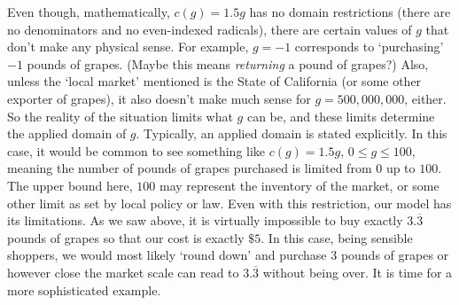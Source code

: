 Even though, mathematically, $c(g) = 1.5g$ has no domain restrictions (there are no denominators and no even-indexed radicals), there are certain values of $g$ that don't make any physical sense.  For example, $g = -1$ corresponds to `purchasing' $-1$ pounds of grapes. (Maybe this means \textit{returning} a pound of grapes?)  Also, unless the `local market' mentioned is the State of California (or some other exporter of grapes), it also doesn't make much sense for $g = 500,\!000,\!000$, either. So the reality of the situation limits what $g$ can be, and these limits determine the applied domain of $g$.  Typically, an applied domain is stated explicitly.  In this case, it would be common to see something like $c(g) = 1.5g$, $0 \leq g \leq 100$, meaning the number of pounds of grapes purchased is limited from $0$ up to $100$. The upper bound here, $100$ may represent the inventory of the market, or some other limit as set by local policy or law.  Even with this restriction, our model has its limitations.  As we saw above, it is virtually impossible to buy exactly  $3.\overline{3}$ pounds of grapes so that our cost is exactly $\$5$.  In this case, being sensible shoppers, we would most likely `round down' and purchase $3$ pounds of grapes or however close the market scale can read to $3.\overline{3}$ without being over.  It is time for a more sophisticated example.



